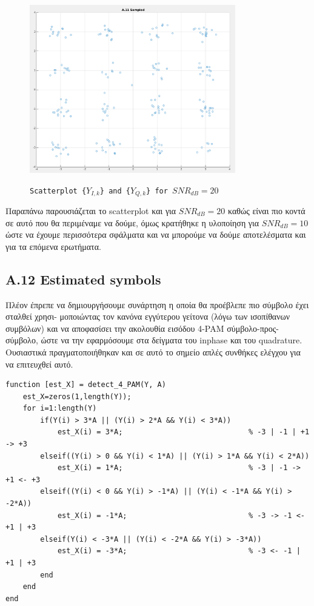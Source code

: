 \documentclass[11pt]{article}
\begin{document}
    \begin{figure}[H]
        \centering
        \includegraphics[scale=0.5, width=0.8\textwidth]{img/A11_SNR_20.png} \\
        \caption{\texttt{Scatterplot \{$Y_{I,k}$\} and \{$Y_{Q,k}$\} for $SNR_{dB}=20$}}
    \end{figure}
    
    \par \noindent
    Παραπάνω παρουσιάζεται το scatterplot και για $SNR_{dB}=20$ καθώς είναι πιο κοντά σε αυτό που θα περιμέναμε να δούμε, όμως κρατήθηκε η υλοποίηση για $SNR_{dB}=10$ ώστε να έχουμε περισσότερα σφάλματα και να μπορούμε να δούμε αποτελέσματα και για τα επόμενα ερωτήματα. 
    
    \subsection*{A.12 Estimated symbols}
    Πλέον έπρεπε να δημιουργήσουμε συνάρτηση η οποία θα προέβλεπε πιο σύμβολο έχει σταλθεί χρησι- μοποιώντας τον κανόνα εγγύτερου γείτονα (λόγω των ισοπίθανων συμβόλων) και να αποφασίσει την ακολουθία εισόδου 4-PAM σύμβολο-προς-σύμβολο, ώστε να την εφαρμόσουμε στα δείγματα του inphase και του quadrature.
    Ουσιαστικά πραγματοποιήθηκαν και σε αυτό το σημείο απλές συνθήκες ελέγχου για να επιτευχθεί αυτό.
    
    \begin{lstlisting}[caption = {\texttt{detect\_4\_PAM()}}]
function [est_X] = detect_4_PAM(Y, A)
    est_X=zeros(1,length(Y));
    for i=1:length(Y)
        if(Y(i) > 3*A || (Y(i) > 2*A && Y(i) < 3*A))                        
            est_X(i) = 3*A;                             % -3 | -1 | +1 -> +3
        elseif((Y(i) > 0 && Y(i) < 1*A) || (Y(i) > 1*A && Y(i) < 2*A))      
            est_X(i) = 1*A;                             % -3 | -1 -> +1 <- +3
        elseif((Y(i) < 0 && Y(i) > -1*A) || (Y(i) < -1*A && Y(i) > -2*A))   
            est_X(i) = -1*A;                            % -3 -> -1 <- +1 | +3
        elseif(Y(i) < -3*A || (Y(i) < -2*A && Y(i) > -3*A))                 
            est_X(i) = -3*A;                            % -3 <- -1 | +1 | +3
        end
    end
end
    \end{lstlisting}
    
\end{document}
